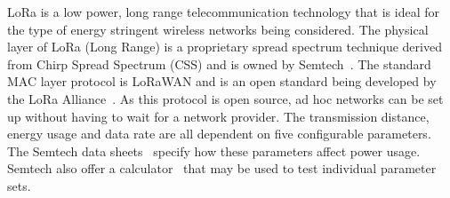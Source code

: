 LoRa is a low power, long range telecommunication technology that is ideal for the type of energy stringent wireless networks being considered. The physical layer of LoRa (Long Range) is a proprietary spread spectrum technique derived from Chirp Spread Spectrum (CSS) and is owned by Semtech~\cite{borLORAforIOT}. The standard MAC layer protocol is LoRaWAN and is an open standard being developed by the LoRa Alliance~\cite{ouluPetajajarvi}. As this protocol is open source, ad hoc networks can be set up without having to wait for a network provider. The transmission distance, energy usage and data rate are all dependent on five configurable parameters. The Semtech data sheets~\cite{lora:sx1272/73} specify how these parameters affect power usage.  Semtech also offer a calculator~\cite{loraCALCULATOR} that may be used to test individual parameter sets.

